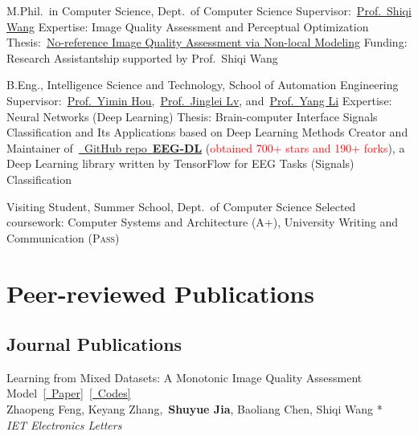 \documentclass{my_cv}
\begin{document}
\workitemsfive
{M.Phil.~in Computer Science, Dept.~of Computer Science}
{Supervisor:~\href{https://www.cs.cityu.edu.hk/~shiqwang/}{Prof.~Shiqi Wang}}
{Expertise: Image Quality Assessment and Perceptual Optimization}
{Thesis:~\href{}{No-reference Image Quality Assessment via Non-local Modeling}}
{Funding: Research Assistantship supported by Prof.~Shiqi Wang}

\workitemsfive
{B.Eng., Intelligence Science and Technology, School of Automation Engineering}
{Supervisor:~\href{https://ieeexplore.ieee.org/author/37290052900}{Prof.~Yimin Hou},~\href{https://www.sydney.edu.au/engineering/about/our-people/academic-staff/jinglei-lv.html}{Prof.~Jinglei Lv}, and~\href{http://meyangli.com/}{Prof.~Yang Li}}
{Expertise: Neural Networks (Deep Learning)}
{Thesis: Brain-computer Interface Signals Classification and Its Applications based on Deep Learning Methods}
{Creator and Maintainer of~\href{https://github.com/SuperBruceJia/EEG-DL}{\faGithub~GitHub repo~\textbf{EEG-DL}} (\textcolor{red}{obtained 700+ stars and 190+ forks}), a Deep Learning library written by TensorFlow for EEG Tasks (Signals) Classification}

\workitemstwo
{Visiting Student, Summer School, Dept.~of Computer Science}
{Selected coursework: Computer Systems and Architecture (\textsc{A}+), University Writing and Communication (\textsc{Pass})}

\hspace*{\fill}


\section{\textbf{Peer-reviewed Publications}}
\subsection{\textbf{Journal Publications}}
\workitemsone
{Learning from Mixed Datasets: A Monotonic Image Quality Assessment Model~\href{https://ietresearch.onlinelibrary.wiley.com/doi/pdfdirect/10.1049/ell2.12698}{[\aiOpenAccess~Paper]}~\href{https://github.com/SuperBruceJia/MonotonicIQA}{[\faGithub~Codes]}\\
Zhaopeng Feng, Keyang Zhang,~\textbf{Shuyue Jia}, Baoliang Chen, Shiqi Wang *\\
\emph{IET Electronics Letters}
}
\end{document}
